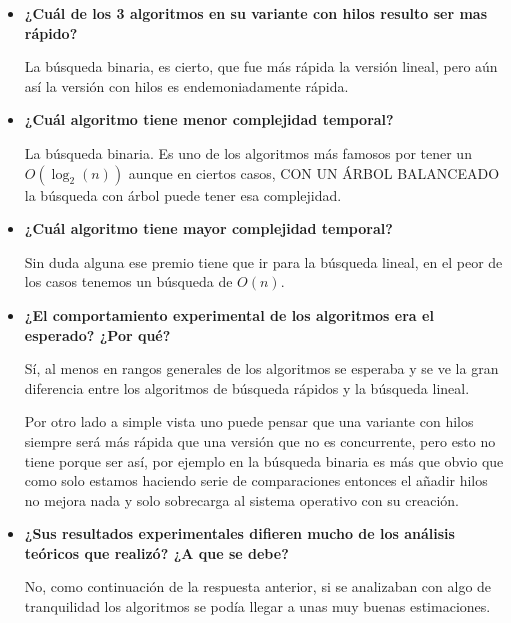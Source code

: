 \documentclass[12pt, fleqn]{article}                             %
\theoremstyle{break}                                            %
\begin{document}
\begin{itemize}
            \item
                \textbf{¿Cuál de los 3 algoritmos en su variante con hilos resulto ser mas rápido?}

                La búsqueda binaria, es cierto, que fue más rápida la versión lineal, pero aún así
                la versión con hilos es endemoniadamente rápida.

            \item
                \textbf{¿Cuál algoritmo tiene menor complejidad temporal?}

                La búsqueda binaria. Es uno de los algoritmos más famosos por tener un $O(\log_2(n))$
                aunque en ciertos casos, CON UN ÁRBOL BALANCEADO la búsqueda con árbol puede tener esa
                complejidad.

            \clearpage

            \item
                \textbf{¿Cuál algoritmo tiene mayor complejidad temporal?}

                Sin duda alguna ese premio tiene que ir para la búsqueda lineal, en el peor de los casos
                tenemos un búsqueda de $O(n)$.
            \item
                \textbf{¿El comportamiento experimental de los algoritmos era el esperado? ¿Por qué?}

                Sí, al menos en rangos generales de los algoritmos se esperaba y se ve la gran diferencia entre
                los algoritmos de búsqueda rápidos y la búsqueda lineal.

                Por otro lado a simple vista uno puede pensar que una variante con hilos siempre será más rápida
                que una versión que no es concurrente, pero esto no tiene porque ser así, por ejemplo
                en la búsqueda binaria es más que obvio que como solo estamos haciendo serie de comparaciones
                entonces el añadir hilos no mejora nada y solo sobrecarga al sistema operativo con su creación.

            \item
                \textbf{¿Sus resultados experimentales difieren mucho de los análisis teóricos
                    que realizó? ¿A que se debe?}

                No, como continuación de la respuesta anterior, si se analizaban con algo de tranquilidad
                los algoritmos se podía llegar a unas muy buenas estimaciones.


\end{itemize}
\end{document}
